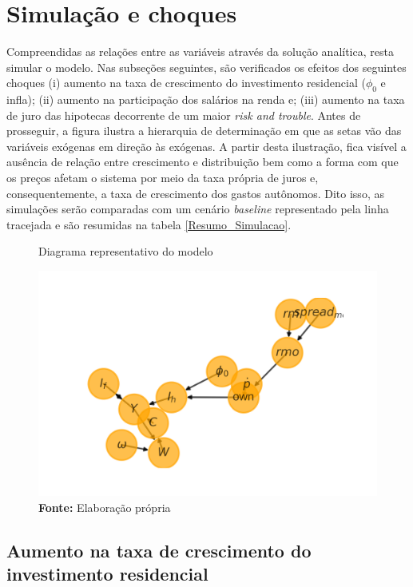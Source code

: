 \section{Simulação e choques}
\label{SecChoques}

Compreendidas as relações entre as variáveis através da solução analítica, resta simular o modelo. Nas subseções seguintes, são verificados os efeitos dos seguintes choques
(i) aumento na taxa de crescimento do investimento residencial ($\phi_0$ e infla); (ii) aumento na participação dos salários na renda e;  (iii) aumento na taxa de juro das hipotecas decorrente de um maior \textit{risk and trouble}. Antes de prosseguir, a figura \label{DAG} ilustra a hierarquia de determinação em que as setas vão das variáveis exógenas em direção às exógenas. A partir desta ilustração, fica visível a ausência de relação entre crescimento e distribuição bem como a forma com que os preços afetam o sistema por meio da taxa própria de juros e, consequentemente, a taxa de crescimento dos gastos autônomos. Dito isso, as simulações serão comparadas com um cenário \textit{baseline} representado pela linha tracejada e são resumidas na tabela \ref{Resumo_Simulacao}.

\begin{figure}[H]
	\centering
	\label{DAG}
	\caption{Diagrama representativo do modelo}
	\includegraphics{../../Modelo/Versoes/Dag.png}
	\caption*{\textbf{Fonte:} Elaboração própria}
\end{figure}



\subsection*{Aumento na taxa de crescimento do investimento residencial}

